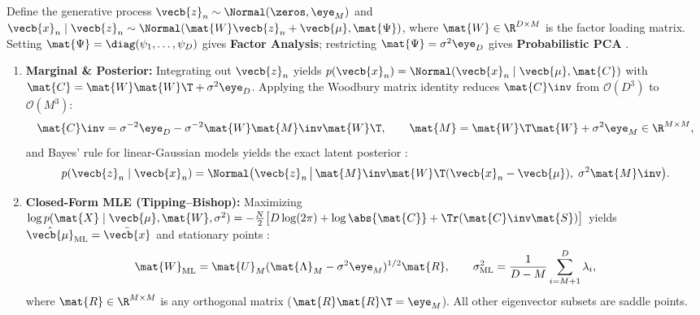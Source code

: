 \documentclass[../../../../master.tex]{subfiles}
\begin{document}
\begin{coremath}
\label{thm:em:ppca}
Define the generative process $\vecb{z}_n \sim \Normal(\zeros, \eye_M)$ and $\vecb{x}_n \mid \vecb{z}_n \sim \Normal(\mat{W}\vecb{z}_n + \vecb{\mu}, \mat{\Psi})$, where $\mat{W} \in \R^{D \times M}$ is the factor loading matrix. Setting $\mat{\Psi} = \diag(\psi_1,\dots,\psi_D)$ gives \textbf{Factor Analysis}; restricting $\mat{\Psi} = \sigma^2 \eye_D$ gives \textbf{Probabilistic PCA} .
\begin{enumerate}
  \item \textbf{Marginal \& Posterior:} Integrating out $\vecb{z}_n$ yields $p(\vecb{x}_n) = \Normal(\vecb{x}_n \mid \vecb{\mu}, \mat{C})$ with $\mat{C} = \mat{W}\mat{W}\T + \sigma^2 \eye_D$. Applying the Woodbury matrix identity reduces $\mat{C}\inv$ from $\mathcal{O}(D^3)$ to $\mathcal{O}(M^3)$:
  \begin{equation}
    \mat{C}\inv = \sigma^{-2}\eye_D - \sigma^{-2}\mat{W}\mat{M}\inv\mat{W}\T, \qquad \mat{M} = \mat{W}\T\mat{W} + \sigma^2\eye_M \in \R^{M \times M},
    \label{eq:em:ppca_woodbury}
  \end{equation}
  and Bayes' rule for linear-Gaussian models yields the exact latent posterior :
  \begin{equation}
    p(\vecb{z}_n \mid \vecb{x}_n) = \Normal\big(\vecb{z}_n \,\big|\, \mat{M}\inv\mat{W}\T(\vecb{x}_n - \vecb{\mu}),\; \sigma^2\mat{M}\inv\big).
    \label{eq:em:ppca_post}
  \end{equation}
  \item \textbf{Closed-Form MLE (Tipping--Bishop):} Maximizing $\log p(\mat{X} \mid \vecb{\mu}, \mat{W}, \sigma^2) = -\frac{N}{2}\big[D\log(2\pi) + \log\abs{\mat{C}} + \Tr(\mat{C}\inv\mat{S})\big]$ yields $\hat{\vecb{\mu}}_{\mathrm{ML}} = \bar{\vecb{x}}$ and stationary points :
  \begin{equation}
    \mat{W}_{\mathrm{ML}} = \mat{U}_M(\mat{\Lambda}_M - \sigma^2\eye_M)^{1/2}\mat{R}, \qquad \sigma^2_{\mathrm{ML}} = \frac{1}{D - M}\sum_{i=M+1}^D \lambda_i,
    \label{eq:em:ppca_mle}
  \end{equation}
  where $\mat{R} \in \R^{M \times M}$ is any orthogonal matrix ($\mat{R}\mat{R}\T = \eye_M$). All other eigenvector subsets are saddle points.

\end{enumerate}
\end{coremath}
\end{document}

